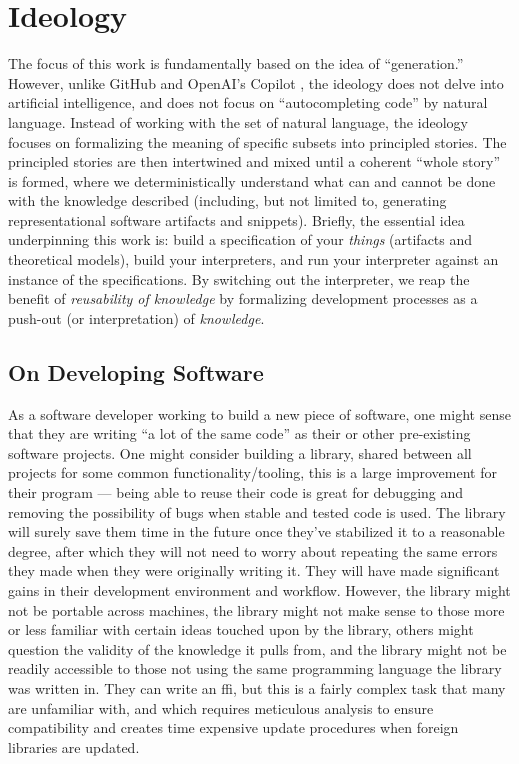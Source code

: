 \chapter{Ideology}
\label{chap:ideology}

The focus of this work is fundamentally based on the idea of ``generation.''
However, unlike GitHub and OpenAI's Copilot \cite{Copilot}, the ideology does
not delve into artificial intelligence, and does not focus on ``autocompleting
code'' by natural language. Instead of working with the set of natural language,
the ideology focuses on formalizing the meaning of specific subsets into
principled stories. The principled stories are then intertwined and mixed until
a coherent ``whole story'' is formed, where we deterministically understand what
can and cannot be done with the knowledge described (including, but not limited
to, generating representational software artifacts and snippets). Briefly, the
essential idea underpinning this work is: build a specification of your
\textit{things} (artifacts and theoretical models), build your interpreters, and
run your interpreter against an instance of the specifications. By switching out
the interpreter, we reap the benefit of \textit{reusability of knowledge} by
formalizing development processes as a push-out (or interpretation) of
\textit{knowledge}.

\section{On Developing Software}
\label{sec:idlgy:on_developing_software}

As a software developer working to build a new piece of software, one might
sense that they are writing ``a lot of the same code'' as their or other
pre-existing software projects. One might consider building a library, shared
between all projects for some common functionality/tooling, this is a large
improvement for their program --- being able to reuse their code is great for
debugging and removing the possibility of bugs when stable and tested code is
used. The library will surely save them time in the future once they've
stabilized it to a reasonable degree, after which they will not need to worry
about repeating the same errors they made when they were originally writing it.
They will have made significant gains in their development environment and
workflow. However, the library might not be portable across machines, the
library might not make sense to those more or less familiar with certain ideas
touched upon by the library, others might question the validity of the knowledge
it pulls from, and the library might not be readily accessible to those not
using the same programming language the library was written in. They can write
an \acs{ffi}, but this is a fairly complex task that many are unfamiliar with,
and which requires meticulous analysis to ensure compatibility and creates time
expensive update procedures when foreign libraries are updated.

